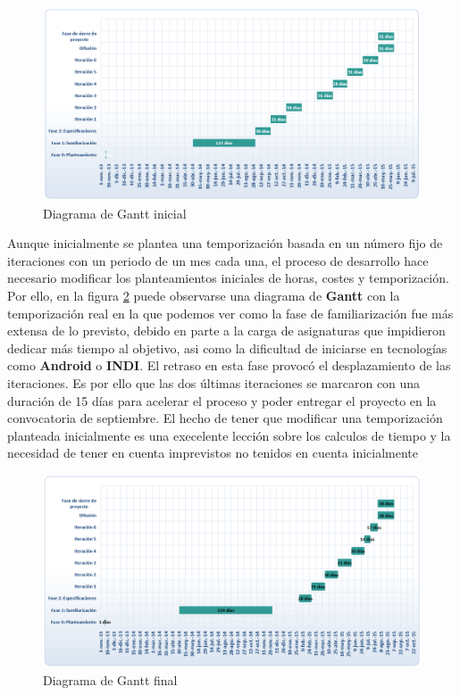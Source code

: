 \begin{figure}[!ht]
  \begin{center}
  \includegraphics[width=1\textwidth]{../images/gantt_ideal.png}
  \caption{Diagrama de Gantt inicial}
  \label{fig:diag_gantt_inicial}
  \end{center}
\end{figure}

\bigskip
Aunque inicialmente se plantea una temporización basada en un número fijo de iteraciones con un periodo de un mes cada una, el proceso de desarrollo hace necesario modificar los planteamientos iniciales de horas, costes y temporización. Por ello, en la figura \ref{fig:diag_gantt_final} puede observarse una diagrama de \textbf{Gantt} con la temporización real en la que podemos ver como la fase de familiarización fue más extensa de lo previsto, debido en parte a la carga de asignaturas que impidieron dedicar más tiempo al objetivo, asi como la dificultad de iniciarse en tecnologías como \textbf{Android} o \textbf{INDI}. El retraso en esta fase provocó el desplazamiento de las iteraciones. Es por ello que las dos últimas iteraciones se marcaron con una duración de 15 días para acelerar el proceso y poder entregar el proyecto en la convocatoria de septiembre. El hecho de tener que modificar una temporización planteada inicialmente es una execelente lección sobre los calculos de tiempo y la necesidad de tener en cuenta imprevistos no tenidos en cuenta inicialmente 

\begin{figure}[!ht]
  \begin{center}
  \includegraphics[width=1\textwidth]{../images/gantt_real.png}
  \caption{Diagrama de Gantt final}
  \label{fig:diag_gantt_final}
  \end{center}
\end{figure}

